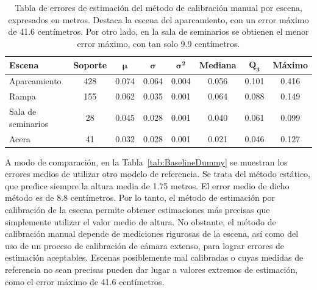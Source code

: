 \begin{table}[!ht]
  \centering
  \scriptsize
\begin{tabular}{|l|c|c|c|c|c|c|c|}
\hline
\rowcolor[HTML]{FFCB2F}
\textbf{Escena} & \textbf{Soporte} & $\bm{\mu}$ & $\bm{\sigma}$ & $\bm{\sigma^2}$ & \textbf{Mediana} & $\bm{Q_3}$ & \textbf{Máximo} \\
\hline
Aparcamiento & 428 & 0.074 & 0.064 & 0.004 &0.056 & 0.101 & 0.416 \\
\hline
Rampa & 155 & 0.062 & 0.035 & 0.001 &0.064 & 0.088 & 0.149 \\
\hline
Sala de seminarios & 28 & 0.045 & 0.028 & 0.001 &0.040 & 0.061 & 0.099 \\
\hline
Acera & 41 & 0.032 & 0.028 & 0.001 &0.021 & 0.046 & 0.127 \\
\hline
\end{tabular}
\caption[Tabla de errores de estimación del método de calibración manual por escena, expresados en metros.]{
  Tabla de errores de estimación del método de calibración manual por escena, expresados en metros.
  Destaca la escena del aparcamiento, con un error máximo de 41.6 centímetros. Por otro lado, en la sala
  de seminarios se obtienen el menor error máximo, con tan solo 9.9 centímetros.
}
\label{tab:ManualResultsByScene}
\end{table}

A modo de comparación, en la Tabla~\ref{tab:BaselineDummy} se muestran
los errores medios de utilizar otro modelo de referencia. Se trata del método estático, que predice siempre la altura media de 1.75 metros.
El error medio de dicho método es de 8.8 centímetros. Por lo tanto, el método de estimación por calibración de la escena
permite obtener estimaciones más precisas que simplemente utilizar el valor medio de altura.
No obstante, el método de calibración manual depende de mediciones rigurosas de la escena, así como del uso
de un proceso de calibración de cámara extenso, para lograr errores de estimación aceptables. Escenas posiblemente mal calibradas
o cuyas medidas de referencia no sean precisas pueden dar lugar a valores extremos de estimación, como el error máximo de 41.6 centímetros.

